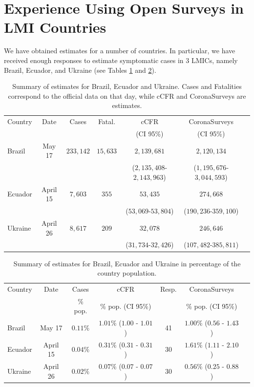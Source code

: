 \documentclass{article}
\begin{document}
\section{Experience Using Open Surveys in LMI Countries}

We have obtained estimates for a number of countries. In particular, we have received enough responses to estimate symptomatic cases in 3 LMICs, namely Brazil, Ecuador, and Ukraine (see Tables \ref{tab:LMICs1} and \ref{tab:LMICs2}). 

\begin{table}
    \centering
    \footnotesize
    \begin{tabular}{|l|c|c|c|c|c|c|}
    \hline
 Country    &  Date       & Cases & Fatal. & cCFR & CoronaSurveys \\ 
            &              &   &  & (CI 95\%)  & (CI 95\%)  \\
 \hline
  Brazil     & May 17 & $233,142$ & $15,633$ & $2,139,681$ & $2,120,134$ \\
     & & & & ($2,135,408$-$2,143,963$) & ($1,195,676$-$3,044,593$) \\
  Ecuador    &  April 15 & $7,603$ & $355$ & $53,435$ & $274,668$ \\
       & & & & ($53,069$-$53,804$) & ($190,236$-$359,100$)  \\
   Ukraine    & April 26 & $8,617$ & $209$ & $32,078$ & $246,646$  \\
        & & & & ($31,734$-$32,426$) & ($107,482$-$385,811$)  \\ \hline
    \end{tabular}
    \caption{Summary of estimates for Brazil, Ecuador and Ukraine. Cases and Fatalities correspond to the official data on that day, while cCFR and CoronaSurveys are estimates. }
    \label{tab:LMICs1}
\end{table}

\begin{table}[t!]
    \centering
    \footnotesize
    \begin{tabular}{|l|c|c|c|c|c|c|}
    \hline
 Country    &  Date       & Cases & cCFR & Resp. & CoronaSurveys \\  
            &         &   \% pop.    & \% pop. (CI 95\%) &            & \% pop. (CI 95\%)  \\
 \hline
  Brazil     & May 17 & $0.11\%$ & $1.01\%$  ($1.00$ - $1.01$) & 41  & $1.00\%$ ($0.56$ - $1.43$)  \\
  Ecuador    & April 15 & $0.04\%$ & $0.31\%$  ($0.31$ - $0.31$) & 30  & $1.61\%$ ($1.11$ - $2.10$)  \\
   Ukraine    & April 26 & $0.02\%$ & $0.07\%$  ($0.07$ - $0.07$) & 30  & $0.56\%$ ($0.25$ - $0.88$)  \\ \hline
    \end{tabular}
    \caption{Summary of estimates for Brazil, Ecuador and Ukraine in percentage of the country population.} 
    \label{tab:LMICs2}
\end{table}
\end{document}
